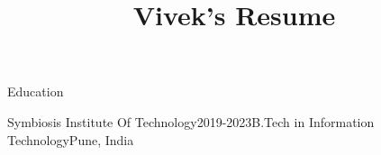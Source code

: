 \documentclass{resume} %
\begin{document}
\title{Vivek's Resume}

\begin{rSection}{Education}

\begin{rSubsection}{Symbiosis Institute Of Technology}{2019-2023}{B.Tech in Information Technology}{Pune, India}

\vspace{-.65cm}
\item[]
\end{rSubsection}
\end{rSection}


\end{document}
